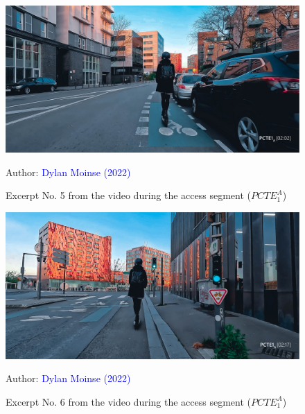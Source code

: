     \begin{figure}[h!]\vspace*{4pt}
        \caption*{Excerpt No. 5 from the video during the access segment (\(PCTE^{A}_{1}\))}
        \centerline{\includegraphics[width=0.75\columnwidth]{src/Figures/Annexes/Extrait_Video_PCTE1_Access_5.jpg}}
        \vspace{5pt}
        \begin{flushright}\scriptsize{
        Author: \textcolor{blue}{Dylan Moinse (2022)}
        }\end{flushright}
    \end{figure}

    \begin{figure}[h!]\vspace*{4pt}
        \caption*{Excerpt No. 6 from the video during the access segment (\(PCTE^{A}_{1}\))}
        \centerline{\includegraphics[width=0.75\columnwidth]{src/Figures/Annexes/Extrait_Video_PCTE1_Access_6.jpg}}
        \vspace{5pt}
        \begin{flushright}\scriptsize{
        Author: \textcolor{blue}{Dylan Moinse (2022)}
        }\end{flushright}
    \end{figure}

